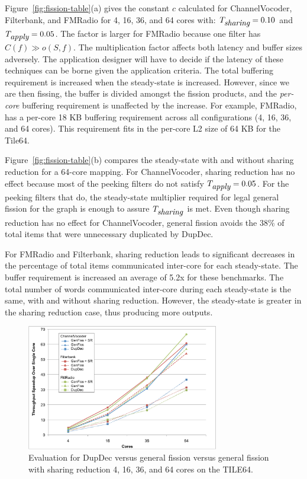 Figure~\ref{fig:fission-table}(a) gives the constant $c$
calculated for ChannelVocoder, Filterbank, and FMRadio for 4, 16, 36,
and 64 cores with: $T_{\mbox{\it sharing}} = 0.10$ and $T_{\mbox{\it apply}} =
0.05$.  The factor is larger for FMRadio because one filter
has $C(f) \gg o(S, f)$.  The multiplication factor affects both
latency and buffer sizes adversely.  The application designer will
have to decide if the latency of these techniques can be borne given
the application criteria.  The total buffering requirement is
increased when the steady-state is increased.  However, since we are
then fissing, the buffer is divided amongst the fission products, and
the {\it per-core} buffering requirement is unaffected by the
increase.  For example, FMRadio, has a per-core 18 KB buffering
requirement across all configurations (4, 16, 36, and 64 cores).  This
requirement fits in the per-core L2 size of 64 KB for the Tile64.

Figure~\ref{fig:fission-table}(b) compares the steady-state with and
without sharing reduction for a 64-core mapping.  For ChannelVocoder,
sharing reduction has no effect because most of the peeking filters do
not satisfy $T_{\mbox{\it apply}} = 0.05$.  For the peeking filters that do,
the steady-state multiplier required for legal general fission for the
graph is enough to assure $T_{\mbox{\it sharing}}$ is met.  Even though
sharing reduction has no effect for ChannelVocoder, general fission
avoids the 38\% of total items that were unnecessary duplicated by
DupDec.

For FMRadio and Filterbank, sharing reduction leads to significant
decreases in the percentage of total items communicated inter-core for
each steady-state.  The buffer requirement is increased an average of
5.2x for these benchmarks.  The total number of words communicated
inter-core during each steady-state is the same, with and without
sharing reduction.  However, the steady-state is greater in the
sharing reduction case, thus producing more outputs.

\begin{figure}[t]
\centering
\includegraphics[width=3.3in]{figures/tilera-chart.pdf}
\caption[Comparing the fission techniques on the TILE64.]{
  Evaluation for DupDec versus general fission versus general fission with sharing reduction
  4, 16, 36, and 64 cores on the TILE64.  \label{fig:tilera-chart}}
\end{figure}

